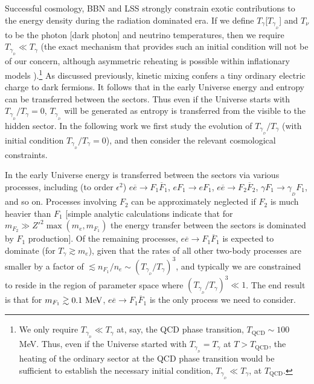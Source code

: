 \documentclass[12pt]{article}
\begin{document}
Successful cosmology, BBN and LSS strongly constrain exotic contributions to the energy density during the radiation dominated era. If we define $T _{\gamma}$[$T _{\gamma _{_D}}$] and $T _{\nu}$ to be the photon [dark photon] and neutrino temperatures, then we require $T _{\gamma _{_D}} \ll T _{\gamma}$ (the exact mechanism that provides such an initial condition will not be of our concern, although asymmetric reheating is possible within inflationary models \cite{hodges}).\footnote{We only require $T _{\gamma _{_D}} \ll T _{\gamma}$ at, say, the QCD phase transition, $T _{\text{QCD}} \sim 100$ MeV. Thus, even if the Universe started with $T _{\gamma _{_D}} = T _{\gamma}$ at $T > T _{\text{QCD}}$, the heating of the ordinary sector at the QCD phase transition would be sufficient to establish the necessary initial condition, $T _{\gamma _{_D}} \ll T _{\gamma}$, at $T _{\text{QCD}}$.} As discussed previously, kinetic mixing confers a tiny ordinary electric charge to dark fermions. It follows that in the early Universe energy and entropy can be transferred between the sectors. Thus even if the Universe starts with $T _{\gamma _{_D}}/T _{\gamma}=0$, $T _{\gamma _{_D}}$ will be generated as entropy is transferred from the visible to the hidden sector. In the following work we first study the evolution of $T _{\gamma _{_D}}/T _{\gamma}$ (with initial condition $T _{\gamma _{_D}}/T _{\gamma} = 0$), and then consider the relevant cosmological constraints.

In the early Universe energy is transferred between the sectors via various processes, including (to order $\epsilon ^2$) $e \overline{e} \rightarrow F _1 \overline{F} _1$, $eF_1 \rightarrow eF_1$, $e \overline{e} \rightarrow F _2 \overline{F} _2$, $\gamma F_1 \rightarrow \gamma _{_D}F _1$, and so on. Processes involving $F_2$ can be approximately neglected if $F_2$ is much heavier than $F_1$ [simple analytic calculations indicate that for $m _{F_2} \gg {Z'} ^2\max (m _e , m _{F_1})$ the energy transfer between the sectors is dominated by $F_1$ production]. Of the remaining processes, $e \overline{e} \rightarrow F _1 \overline{F} _1$ is expected to dominate (for $T _{\gamma} \gtrsim m _e$), given that the rates of all other two-body processes are smaller by a factor of $\lesssim n _{F_1}/n _e \sim (T _{\gamma _{_D}}/T _{\gamma}) ^3$, and typically we are constrained to reside in the region of parameter space where $(T _{\gamma _{_D}}/T _{\gamma}) ^3 \ll 1$. The end result is that for $m _{F_1} \gtrsim 0.1 \ {\rm MeV}$, $e\overline{e} \rightarrow F_1\overline{F}_1$ is the only process we need to consider.
\end{document}

